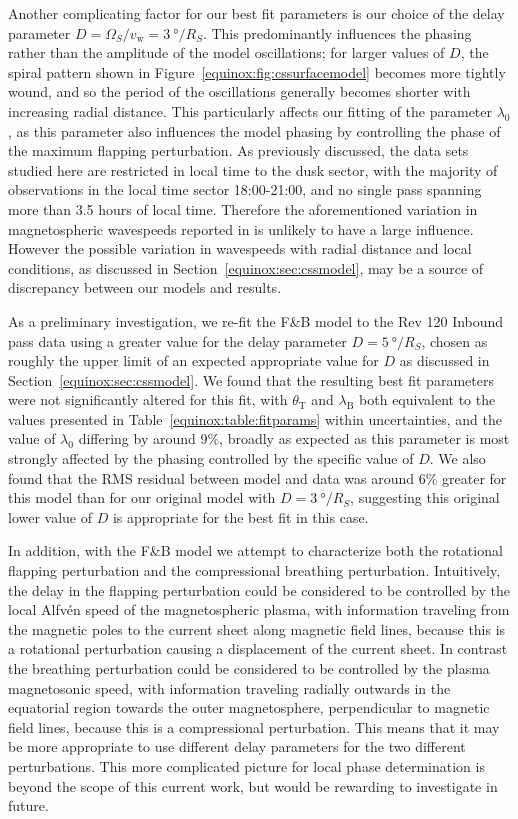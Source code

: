Another complicating factor for our best fit parameters is our choice of the delay parameter $D = \Omega_S/v_\mathrm{w} = \SI{3}{\degree/R_S}$. This predominantly influences the phasing rather than the amplitude of the model oscillations; for larger values of $D$, the spiral pattern shown in Figure~\ref{equinox:fig:cssurfacemodel} becomes more tightly wound, and so the period of the oscillations generally becomes shorter with increasing radial distance. This particularly affects our fitting of the parameter $\lambda_0$, as this parameter also influences the model phasing by controlling the phase of the maximum flapping perturbation. As previously discussed, the data sets studied here are restricted in local time to the dusk sector, with the majority of observations in the local time sector 18:00{\--}21:00, and no single pass spanning more than 3.5 hours of local time. Therefore the aforementioned variation in magnetospheric wavespeeds reported in \citet{andrews2010} is unlikely to have a large influence. However the possible variation in wavespeeds with radial distance and local conditions, as discussed in Section~\ref{equinox:sec:cssmodel}, may be a source of discrepancy between our models and results. 

As a preliminary investigation, we re-fit the F{\&}B model to the Rev 120 Inbound pass data using a greater value for the delay parameter $D = \SI{5}{\degree/R_S}$, chosen as roughly the upper limit of an expected appropriate value for $D$ as discussed in Section~\ref{equinox:sec:cssmodel}. We found that the resulting best fit parameters were not significantly altered for this fit, with $\theta_\mathrm{T}$ and $\lambda_\mathrm{B}$ both equivalent to the values presented in Table~\ref{equinox:table:fitparams} within uncertainties, and the value of $\lambda_0$ differing by around 9\%, broadly as expected as this parameter is most strongly affected by the phasing controlled by the specific value of $D$. We also found that the RMS residual between model and data was around 6\% greater for this model than for our original model with $D = \SI{3}{\degree/R_S}$, suggesting this original lower value of $D$ is appropriate for the best fit in this case.

In addition, with the F{\&}B model we attempt to characterize both the rotational flapping perturbation and the compressional breathing perturbation. Intuitively, the delay in the flapping perturbation could be considered to be controlled by the local Alfv\'{e}n speed of the magnetospheric plasma, with information traveling from the magnetic poles to the current sheet along magnetic field lines, because this is a rotational perturbation causing a displacement of the current sheet. In contrast the breathing perturbation could be considered to be controlled by the plasma magnetosonic speed, with information traveling radially outwards in the equatorial region towards the outer magnetosphere, perpendicular to magnetic field lines, because this is a compressional perturbation. This means that it may be more appropriate to use different delay parameters for the two different perturbations. This more complicated picture for local phase determination is beyond the scope of this current work, but would be rewarding to investigate in future.

